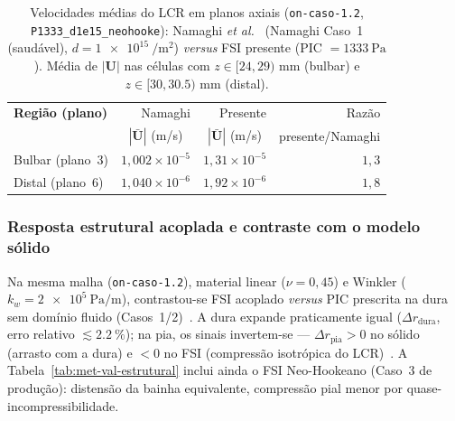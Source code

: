 \begin{table}[h!]
\centering
\small
\caption{Velocidades médias do LCR em planos axiais (\texttt{on-caso-1.2}, \texttt{P1333\_d1e15\_neohooke}): Namaghi \textit{et al.}~\cite{namaghi2026} (Namaghi Caso~1 (saudável), $d = \SI{1e15}{\per\meter\squared}$) \textit{versus} FSI presente (PIC $= \SI{1333}{\pascal}$). Média de $|\mathbf{U}|$ nas células com $z \in [24, 29)$ mm (bulbar) e $z \in [30, 30.5)$ mm (distal).}
\label{tab:met-val-vel}
\begin{tabular}{l r r r}
\toprule
\textbf{Região (plano)} & Namaghi & Presente & Razão \\
 & \multicolumn{1}{c}{$|\bar{\mathbf{U}}|$ (m/s)} & \multicolumn{1}{c}{$|\bar{\mathbf{U}}|$ (m/s)} & presente/Namaghi \\
\midrule
Bulbar (plano~3) & $1{,}002 \times 10^{-5}$ & $1{,}31 \times 10^{-5}$ & $1{,}3$ \\
Distal (plano~6) & $1{,}040 \times 10^{-6}$ & $1{,}92 \times 10^{-6}$ & $1{,}8$ \\
\bottomrule
\end{tabular}
\end{table}

\subsubsection*{Resposta estrutural acoplada e contraste com o modelo sólido}

Na mesma malha (\texttt{on-caso-1.2}), material linear ($\nu = 0{,}45$) e Winkler ($k_w = \SI{2e5}{\pascal\per\meter}$), contrastou-se FSI acoplado \textit{versus} PIC prescrita na dura sem domínio fluido (Casos~1/2)~\cite{furlani}. A dura expande praticamente igual ($\Delta r_{\mathrm{dura}}$, erro relativo $\lesssim \SI{2.2}{\percent}$); na pia, os sinais invertem-se --- $\Delta r_{\mathrm{pia}} > 0$ no sólido (arrasto com a dura) e $< 0$ no FSI (compressão isotrópica do LCR)~\cite{lee2020, furlani}. A Tabela~\ref{tab:met-val-estrutural} inclui ainda o FSI Neo-Hookeano (Caso~3 de produção): distensão da bainha equivalente, compressão pial menor por quase-incompressibilidade.

